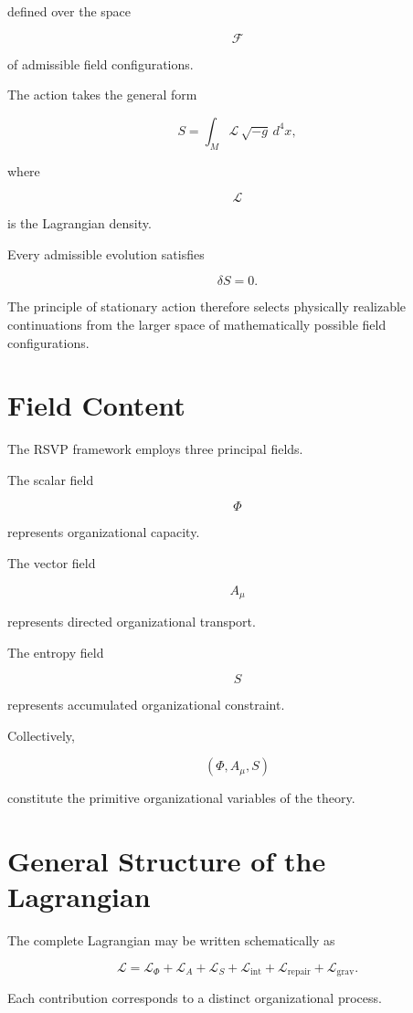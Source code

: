 \documentclass[11pt,oneside]{book}
\numberwithin{equation}{chapter}
\theoremstyle{definition}
\theoremstyle{plain}
\begin{document}
defined over the space

\[
\mathcal F
\]

of admissible field configurations.

The action takes the general form

\[
S
=
\int_M
\mathcal L
\,
\sqrt{-g}
\,
d^4x,
\]

where

\[
\mathcal L
\]

is the Lagrangian density.

Every admissible evolution satisfies

\[
\delta S
=
0.
\]

The principle of stationary action therefore selects physically realizable
continuations from the larger space of mathematically possible field
configurations.

\section{Field Content}

The RSVP framework employs three principal fields.

The scalar field

\[
\Phi
\]

represents organizational capacity.

The vector field

\[
A_\mu
\]

represents directed organizational transport.

The entropy field

\[
S
\]

represents accumulated organizational constraint.

Collectively,

\[
(\Phi,A_\mu,S)
\]

constitute the primitive organizational variables of the theory.

\section{General Structure of the Lagrangian}

The complete Lagrangian may be written schematically as

\[
\mathcal L
=
\mathcal L_\Phi
+
\mathcal L_A
+
\mathcal L_S
+
\mathcal L_{\mathrm{int}}
+
\mathcal L_{\mathrm{repair}}
+
\mathcal L_{\mathrm{grav}}.
\]

Each contribution corresponds to a distinct organizational process.
\end{document}
